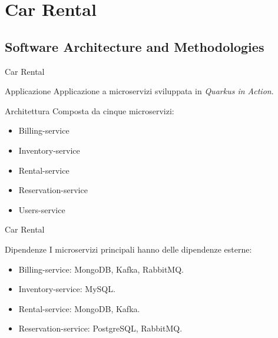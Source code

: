 \section{Car Rental}

\subsection{Software Architecture and Methodologies}

\begin{frame}{Car Rental}
    \begin{block}{Applicazione}
        Applicazione a microservizi sviluppata in \textit{Quarkus in Action}.
    \end{block}
    \begin{block}{Architettura}
        Composta da cinque microservizi:
        \begin{itemize}
            \item Billing-service
            \item Inventory-service
            \item Rental-service
            \item Reservation-service
            \item Users-service
        \end{itemize}
    \end{block}
\end{frame}

\begin{frame}{Car Rental}
    \begin{block}{Dipendenze}
        I microservizi principali hanno delle dipendenze esterne:
        \begin{itemize}
            \item Billing-service: MongoDB, Kafka, RabbitMQ.
            \item Inventory-service: MySQL.
            \item Rental-service: MongoDB, Kafka.
            \item Reservation-service: PostgreSQL, RabbitMQ.
        \end{itemize}
    \end{block}
\end{frame}

